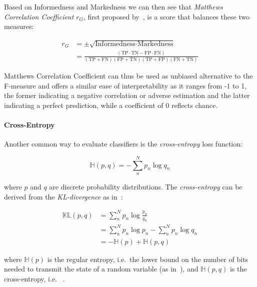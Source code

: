 Based on Informedness and Markedness we can then see that \emph{Matthews Correlation Coefficient} $r_{G}$, first proposed by~\cite{Matthews:1975aa}, is a score that balances these two measures:

\begin{equation}
  \begin{split}
  r_{G} &= \pm \sqrt{\text{Informedness} \cdot \text{Markedness}} \\
  &= \frac{(\text{TP} \cdot \text{TN} - \text{FP} \cdot \text{FN})}{(\text{TP} + \text{FN})(\text{FP} + \text{TN})(\text{TP} + \text{FP})(\text{FN} + \text{TN})}
\end{split}
\end{equation}

Matthews Correlation Coefficient can thus be used as unbiased alternative to the F-measure and offers a similar ease of interpretability as it ranges from -1 to 1, the former indicating a negative correlation or adverse estimation and the latter  indicating a perfect prediction, while a coefficient of 0 reflects chance.

\paragraph{Cross-Entropy}
\label{par:Cross-Entropy}

Another common way to evaluate classifiers is the \emph{cross-entropy} loss function:

\begin{equation}
  \mathbb{H}(p,q) = - \sum_n^N p_n \log q_n
\end{equation}

where $p$ and $q$ are discrete probability distributions. The \emph{cross-entropy} can be derived from the \emph{KL-divergence} as in~\cite[Chapter 2.8.2, p.~57]{Murphy:2012aa}:

\begin{equation}
  \begin{split}
  \mathbb{KL}(p,q) &= \sum_n^N p_n \log \frac{p_n}{q_n} \\
  &= \sum_n^N p_n \log p_n - \sum_n^N p_n \log q_n \\
  &= - \mathbb{H}(p) + \mathbb{H}(p,q)
\end{split}
\end{equation}

where $\mathbb{H}(p)$ is the regular entropy, i.e.\ the lower bound on the number of bits needed to transmit the state of a random variable (as in~\cite{Shannon:2001aa}), and $\mathbb{H}(p,q)$ is the cross-entropy, i.e. ~\cite[Chapter 2.8.2, p.~57]{Murphy:2012aa}.

